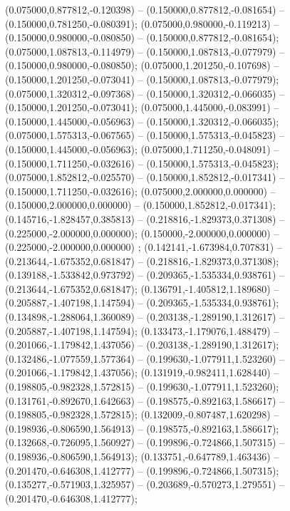  (0.075000,0.877812,-0.120398) -- (0.150000,0.877812,-0.081654) -- (0.150000,0.781250,-0.080391);
 (0.075000,0.980000,-0.119213) -- (0.150000,0.980000,-0.080850) -- (0.150000,0.877812,-0.081654);
 (0.075000,1.087813,-0.114979) -- (0.150000,1.087813,-0.077979) -- (0.150000,0.980000,-0.080850);
 (0.075000,1.201250,-0.107698) -- (0.150000,1.201250,-0.073041) -- (0.150000,1.087813,-0.077979);
 (0.075000,1.320312,-0.097368) -- (0.150000,1.320312,-0.066035) -- (0.150000,1.201250,-0.073041);
 (0.075000,1.445000,-0.083991) -- (0.150000,1.445000,-0.056963) -- (0.150000,1.320312,-0.066035);
 (0.075000,1.575313,-0.067565) -- (0.150000,1.575313,-0.045823) -- (0.150000,1.445000,-0.056963);
 (0.075000,1.711250,-0.048091) -- (0.150000,1.711250,-0.032616) -- (0.150000,1.575313,-0.045823);
 (0.075000,1.852812,-0.025570) -- (0.150000,1.852812,-0.017341) -- (0.150000,1.711250,-0.032616);
 (0.075000,2.000000,0.000000) -- (0.150000,2.000000,0.000000) -- (0.150000,1.852812,-0.017341);
 (0.145716,-1.828457,0.385813) -- (0.218816,-1.829373,0.371308) -- (0.225000,-2.000000,0.000000);
 (0.150000,-2.000000,0.000000) -- (0.225000,-2.000000,0.000000) ;
 (0.142141,-1.673984,0.707831) -- (0.213644,-1.675352,0.681847) -- (0.218816,-1.829373,0.371308);
 (0.139188,-1.533842,0.973792) -- (0.209365,-1.535334,0.938761) -- (0.213644,-1.675352,0.681847);
 (0.136791,-1.405812,1.189680) -- (0.205887,-1.407198,1.147594) -- (0.209365,-1.535334,0.938761);
 (0.134898,-1.288064,1.360089) -- (0.203138,-1.289190,1.312617) -- (0.205887,-1.407198,1.147594);
 (0.133473,-1.179076,1.488479) -- (0.201066,-1.179842,1.437056) -- (0.203138,-1.289190,1.312617);
 (0.132486,-1.077559,1.577364) -- (0.199630,-1.077911,1.523260) -- (0.201066,-1.179842,1.437056);
 (0.131919,-0.982411,1.628440) -- (0.198805,-0.982328,1.572815) -- (0.199630,-1.077911,1.523260);
 (0.131761,-0.892670,1.642663) -- (0.198575,-0.892163,1.586617) -- (0.198805,-0.982328,1.572815);
 (0.132009,-0.807487,1.620298) -- (0.198936,-0.806590,1.564913) -- (0.198575,-0.892163,1.586617);
 (0.132668,-0.726095,1.560927) -- (0.199896,-0.724866,1.507315) -- (0.198936,-0.806590,1.564913);
 (0.133751,-0.647789,1.463436) -- (0.201470,-0.646308,1.412777) -- (0.199896,-0.724866,1.507315);
 (0.135277,-0.571903,1.325957) -- (0.203689,-0.570273,1.279551) -- (0.201470,-0.646308,1.412777);

